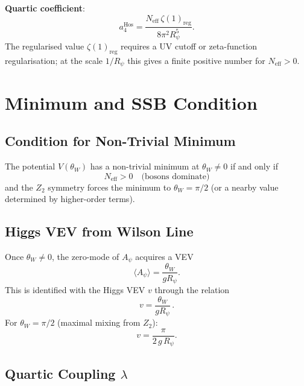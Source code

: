 \documentclass[12pt]{article}
\theoremstyle{definition}
\theoremstyle{remark}
\begin{document}
\noindent\textbf{Quartic coefficient}:
\begin{equation}
  \label{eq:a4_hosotani}
  a_4^{\text{Hos}} = \frac{N_{\text{eff}}\,\zeta(1)_{\text{reg}}}{8\pi^2 R_\psi^5}.
\end{equation}
The regularised value $\zeta(1)_{\text{reg}}$ requires a UV cutoff or
zeta-function regularisation; at the scale $1/R_\psi$ this gives a
finite positive number for $N_{\text{eff}} > 0$.

\section{Minimum and SSB Condition}
\label{sec:minimum}

\subsection{Condition for Non-Trivial Minimum}

The potential $V(\theta_W)$ has a non-trivial minimum at
$\theta_W \neq 0$ if and only if
\begin{equation}
  \label{eq:ssb_condition}
  N_{\text{eff}} > 0
  \quad\text{(bosons dominate)}
\end{equation}
and the $Z_2$ symmetry forces the minimum to $\theta_W = \pi/2$
(or a nearby value determined by higher-order terms).

\subsection{Higgs VEV from Wilson Line}

Once $\theta_W \neq 0$, the zero-mode of $A_\psi$ acquires a VEV
\begin{equation}
  \langle A_\psi \rangle = \frac{\theta_W}{g R_\psi}.
\end{equation}
This is identified with the Higgs VEV $v$ through the relation
\begin{equation}
  \label{eq:higgs_vev}
  v = \frac{\theta_W}{g R_\psi}\,.
\end{equation}
For $\theta_W = \pi/2$ (maximal mixing from $Z_2$):
\begin{equation}
  v = \frac{\pi}{2\,g\,R_\psi}.
\end{equation}

\subsection{Quartic Coupling $\lambda$}
\end{document}
